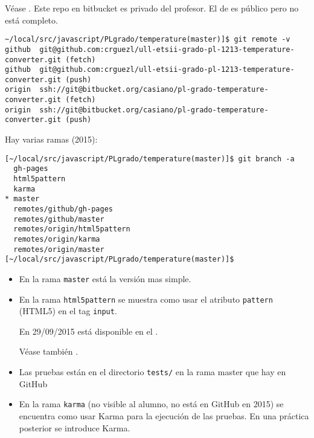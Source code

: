 \label{sectionpractica:conversordetemperaturas}

\label{parrafo:dondetemperatura}
Véase 
.
Este repo en bitbucket es privado del profesor.
El de 
es público pero no está completo.
\begin{verbatim}
~/local/src/javascript/PLgrado/temperature(master)]$ git remote -v
github  git@github.com:crguezl/ull-etsii-grado-pl-1213-temperature-converter.git (fetch)
github  git@github.com:crguezl/ull-etsii-grado-pl-1213-temperature-converter.git (push)
origin  ssh://git@bitbucket.org/casiano/pl-grado-temperature-converter.git (fetch)
origin  ssh://git@bitbucket.org/casiano/pl-grado-temperature-converter.git (push)
\end{verbatim}

Hay varias ramas (2015):

\begin{verbatim}
[~/local/src/javascript/PLgrado/temperature(master)]$ git branch -a
  gh-pages
  html5pattern
  karma
* master
  remotes/github/gh-pages
  remotes/github/master
  remotes/origin/html5pattern
  remotes/origin/karma
  remotes/origin/master
[~/local/src/javascript/PLgrado/temperature(master)]$
\end{verbatim}
\begin{itemize}
\item
En la rama \verb|master| está la versión mas simple.
\item
En la rama \verb|html5pattern| se muestra como usar el atributo \verb|pattern| (HTML5) 
en el tag \verb|input|.

En 29/09/2015 está disponible en el 
.

Véase también
.
\item
Las pruebas están en el directorio \verb|tests/| en la rama master  que hay en GitHub 
\item
En la rama \verb|karma| (no visible al alumno, no está en GitHub en 2015) se encuentra como usar Karma para la ejecución de las pruebas.
En una práctica posterior se introduce Karma.
\end{itemize}


